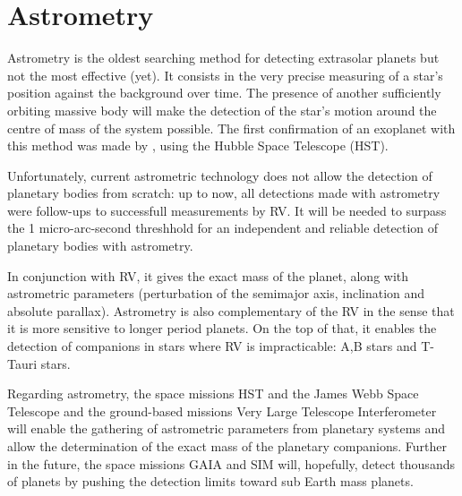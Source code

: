 \documentclass[dvips,12pt,a4paper]{report}
\begin{document}
\section{Astrometry}
\label{astrometry}
Astrometry is the oldest searching method for detecting extrasolar planets but not the most effective (yet). It consists in the very precise measuring of a star's position against the background over time. The presence of another sufficiently orbiting massive body will make the detection of the star's motion around the centre of mass of the system possible. The first confirmation of an exoplanet with this method was made by \citet{Benedict-2002}, using the Hubble Space Telescope (HST).

Unfortunately, current astrometric technology does not allow the detection of planetary bodies from scratch: up to now, all detections made with astrometry were follow-ups to successfull measurements by RV. It will be needed to surpass the 1 micro-arc-second threshhold for an independent and reliable detection of planetary bodies with astrometry.

In conjunction with RV, it gives the exact mass of the planet, along with astrometric parameters (perturbation of the semimajor axis, inclination and absolute parallax). Astrometry is also complementary of the RV in the sense that it is more sensitive to longer period planets. On the top of that, it enables the detection of companions in stars where RV is impracticable: A,B stars and T-Tauri stars.

Regarding astrometry, the space missions HST and the James Webb Space Telescope and the ground-based missions Very Large Telescope Interferometer will enable the gathering of astrometric parameters from planetary systems and allow the determination of the exact mass of the planetary companions. Further in the future, the space missions GAIA and SIM will, hopefully, detect thousands of planets by pushing the detection limits toward sub Earth mass planets.
\end{document}

